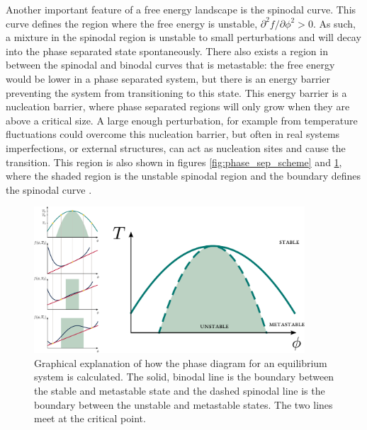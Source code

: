 Another important feature of a free energy landscape is the spinodal curve. This curve defines the region where the free energy is unstable, $\partial^2 f/\partial \phi^2 > 0$. As such, a mixture in the spinodal region is unstable to small perturbations and will decay into the phase separated state spontaneously. There also exists a region in between the spinodal and binodal curves that is metastable: the free energy would be lower in a phase separated system, but there is an energy barrier preventing the system from transitioning to this state. This energy barrier is a nucleation barrier, where phase separated regions will only grow when they are above a critical size. A large enough perturbation, for example from temperature fluctuations could overcome this nucleation barrier, but often in real systems imperfections, or external structures, can act as nucleation sites and cause the transition. This region is also shown in figures \ref{fig:phase_sep_scheme} and \ref{fig:bino_spino_scheme}, where the shaded region is the unstable spinodal region and the boundary defines the spinodal curve \cite{jones2002soft}.

\begin{figure}
    \centering
    \includegraphics[width=0.9\textwidth]{figures/2-cips-figs/bino_spino_scheme.pdf}
    \caption{Graphical explanation of how the phase diagram for an equilibrium system is calculated. The solid, binodal line is the boundary between the stable and metastable state and the dashed spinodal line is the boundary between the unstable and metastable states. The two lines meet at the critical point.}
    \label{fig:bino_spino_scheme}
\end{figure}


